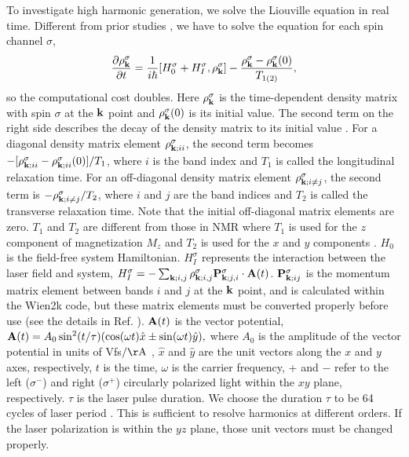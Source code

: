 \documentclass[checkin,showpacs,psfig,aps,pra]{revtex4}
\newcommand{\be}{\begin{equation}}
\newcommand{\ee}{\end{equation}}
\begin{document}
To investigate high harmonic generation, we solve the Liouville
equation in real time. Different from prior studies \cite{prb19}, we
have to solve the equation for each spin channel $\sigma$, \be
\frac{\partial \rho_{\bf k}^\sigma}{\partial t}= \frac{1}{i\hbar}
     [H_0^\sigma+H_I^\sigma,\rho_{\bf k}^\sigma] -\frac{ \rho_{\bf
         k}^\sigma- \rho_{\bf k}^\sigma(0)}{T_{1(2)}}, \label{decay}
     \ee so the computational cost doubles.  Here $\rho_{\bf
       k}^\sigma$ is the time-dependent density matrix with spin
     $\sigma$ at the ${\bf k}$ point and $\rho_{\bf k}^\sigma(0)$ is
     its initial value. {The second term on the right side
       describes the decay of the density matrix to its initial value
       \cite{shen}.  For a diagonal density matrix element $\rho_{{\bf
           k};ii}^\sigma$, the second term becomes $-[\rho_{{\bf
             k};ii}^\sigma - \rho_{{\bf k};ii}^\sigma(0)]/T_1 $, where
       $i$ is the band index and $T_1$ is called the longitudinal
       relaxation time. For an off-diagonal density matrix element
       $\rho_{{\bf k};i\ne j}^\sigma$, the second term is $-\rho_{{\bf
           k};i\ne j}^\sigma /T_2 $, where $i$ and $j$ are the band
       indices and $T_2$ is called the transverse relaxation time.
       Note that the initial off-diagonal matrix elements are
       zero. $T_1$ and $T_2$ are different from those in NMR where
       $T_1$ is used for the $z$ component of magnetization $M_z$ and
       $T_2$ is used for the $x$ and $y$ components \cite{kittel}.}
     $H_0$ is the field-free system Hamiltonian.  $H_I^\sigma$
     represents the interaction between the laser field and system, $
     H_I^\sigma=-\sum_{{\bf k};i,j} \rho_{{\bf k};i,j}^\sigma {\bf
       P}_{{\bf k};j,i}^\sigma \cdot {\bf A}(t)$.  {${\bf
         P}_{{\bf k};ij}^\sigma$ is the momentum matrix element
       between bands $i$ and $j$ at the ${\bf k}$ point, and is
       calculated within the Wien2k code, but these matrix elements
       must be converted properly before use (see the details in
       Ref. \cite{ourbook})}.  ${\bf A}(t)$ is the vector potential, $
     {\bf A}(t)= A_0 \sin^2(t/\tau) (\cos(\omega t) \hat{x} \pm
     \sin(\omega t) \hat{y}), $ where $A_0$ is the amplitude of the
     vector potential in units of Vfs$/\rm\AA$ \cite{nc18}, $\hat{x}$
     and $\hat{y}$ are the unit vectors along the $x$ and $y$ axes,
     respectively, $t$ is the time, $\omega$ is the carrier frequency,
     + and $-$ refer to the left ($\sigma^-$) and right ($\sigma^+$)
     circularly polarized light within the $xy$ plane, respectively.
     $\tau$ is the laser pulse duration.  We choose the duration
     $\tau$ to be 64 cycles of laser period \cite{prl05}. This is
     sufficient to resolve harmonics at different orders. If the laser
     polarization is within the $yz$ plane, those unit vectors must be
     changed properly. 
\end{document}
